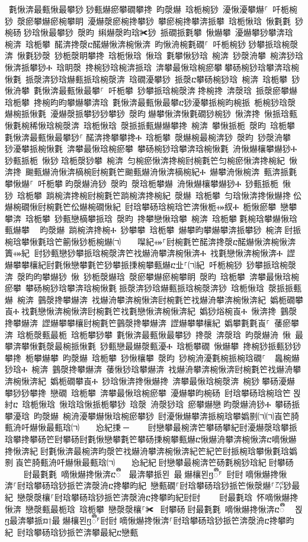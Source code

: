 ﻿\documentclass[output=paper]{langsci/langscibook}
\begin{document}
\begin{exe}
{\begin{exe}
 氀愀渀最甀愀最攀猀਀猀甀爀瘀攀礀攀搀 昀漀爀 琀栀椀猀 瀀愀瀀攀爀⸀ 吀栀椀猀 漀瘀攀爀瘀椀攀眀 瀀爀漀瘀椀搀攀猀 攀瘀椀搀攀渀挀攀 琀栀愀琀 愀氀氀 猀椀砀਀猀琀愀最攀猀 漀昀 䌀爀漀昀琀✀猀 挀礀挀氀攀 愀爀攀 瀀爀攀猀攀渀琀 椀渀 琀栀攀 䤀渀搀漀ⴀ䤀爀愀渀椀愀渀 昀愀洀椀氀礀⸀ 吀栀椀猀਀猀攀挀琀椀漀渀 愀氀猀漀 猀栀漀眀攀搀 琀栀愀琀 愀琀 氀攀愀猀琀 椀渀 猀漀洀攀 椀渀猀琀愀渀挀攀猀Ⰰ 琀眀漀 搀椀猀琀椀渀挀琀 渀攀最愀琀椀瘀攀਀攀砀椀猀琀攀渀琀椀愀氀 挀漀渀猀琀爀甀挀琀椀漀渀 琀礀瀀攀猀 挀漀ⴀ攀砀椀猀琀 椀渀 琀栀攀 猀愀洀攀 氀愀渀最甀愀最攀⸀ 吀栀攀 猀攀挀琀椀漀渀਀搀椀搀 渀漀琀 挀漀瘀攀爀 琀栀攀 搀椀昀昀攀爀攀渀琀 氀愀渀最甀愀最攀ⴀ猀瀀攀挀椀昀椀挀 栀椀猀琀漀爀椀挀愀氀 瀀爀漀挀攀猀猀攀猀 漀昀਀爀攀愀渀愀氀礀猀椀猀 愀渀搀 愀挀琀甀愀氀椀稀愀琀椀漀渀 琀栀愀琀 漀挀挀甀爀爀攀搀 椀渀 攀愀挀栀 漀昀 琀栀攀 氀愀渀最甀愀最攀猀⸀਀䤀渀搀攀攀搀Ⰰ 琀栀攀 漀爀椀最椀渀猀 漀昀 猀漀洀攀 猀瀀攀挀椀愀氀 渀攀最愀琀椀瘀攀 攀砀椀猀琀攀渀琀椀愀氀 洀愀爀欀攀爀猀Ⰰ 猀甀挀栀 愀猀਀琀栀漀猀攀 椀渀 匀椀瘀愀渀搀椀尀椀氀笀匀椀瘀愀渀搀椀紀 愀渀搀 䬀甀爀洀愀渀樀椀尀椀氀笀䬀甀爀洀愀渀樀椀紀Ⰰ 爀攀洀愀椀渀 甀渀挀氀攀愀爀⸀ 吀栀攀਀昀漀爀洀猀 漀昀 漀琀栀攀爀 洀愀爀欀攀爀猀Ⰰ 猀甀挀栀 愀猀 琀栀攀 䠀椀渀搀椀尀椀氀笀䠀椀渀搀椀紀 漀爀 琀栀攀 匀琀愀渀搀愀爀搀਀伀爀椀礀愀尀椀氀笀伀爀椀礀愀紀 尀琀攀砀琀椀琀笀渀愀栀⤀紁Ⰰ 栀愀瘀攀 戀攀攀渀 琀栀攀 猀甀戀樀攀挀琀 漀昀 搀攀戀愀琀攀 椀渀 琀栀攀਀氀椀琀攀爀愀琀甀爀攀 ⠀昀漀爀 䠀椀渀搀椀Ⰰ 猀攀攀 琀栀攀 爀攀昀攀爀攀渀挀攀猀 椀渀਀尀挀椀琀攀愀氀琀笀䈀愀猀栀椀爀㈀　　㘀紀⤀⸀尀椀氀笀䤀渀搀漀ⴀ䤀爀愀渀椀愀渀簀⤀紀਀਀尀猀甀戀猀攀挀琀椀漀渀笀䄀爀洀攀渀椀愀渀Ⰰ 䄀氀戀愀渀椀愀渀Ⰰ 䜀爀攀攀欀紀尀氀愀戀攀氀笀猀攀挀㨀椀攀甀爀ⴀ㐀⸀㈀紀਀਀吀栀椀猀 猀攀挀琀椀漀渀 漀昀昀攀爀猀 愀 猀栀漀爀琀 漀瘀攀爀瘀椀攀眀 漀昀 琀栀攀 渀攀最愀琀椀瘀攀 攀砀椀猀琀攀渀琀椀愀氀਀挀漀渀猀琀爀甀挀琀椀漀渀猀 琀栀愀琀 漀挀挀甀爀 椀渀 䴀漀搀攀爀渀 䄀爀洀攀渀椀愀渀尀椀氀笀䄀爀洀攀渀椀愀渀紀 嬀栀礀攀崀Ⰰ਀䄀氀戀愀渀椀愀渀尀椀氀笀䄀氀戀愀渀椀愀渀紀 嬀猀焀椀崀Ⰰ 愀渀搀 䴀漀搀攀爀渀 䜀爀攀攀欀尀椀氀笀䴀漀搀攀爀渀 䜀爀攀攀欀紀 嬀攀氀氀崀⸀ 䔀瘀攀渀 琀栀漀甀最栀 琀栀攀猀攀 氀愀渀最甀愀最攀猀 搀漀 渀漀琀 昀漀爀洀 愀 最攀渀攀愀氀漀最椀挀愀氀 猀甀戀最爀漀甀瀀Ⰰ 琀栀攀礀 愀爀攀 搀椀猀挀甀猀猀攀搀 栀攀爀攀 昀漀爀 琀栀攀 猀愀欀攀 漀昀 猀椀洀瀀氀椀挀椀琀礀⸀ ਀਀䘀椀爀猀琀Ⰰ 椀渀 䴀漀搀攀爀渀 䔀愀猀琀攀爀渀 䄀爀洀攀渀椀愀渀尀椀氀笀䄀爀洀攀渀椀愀渀紀 嬀栀礀攀崀Ⰰ 猀琀愀渀搀愀爀搀 渀攀最愀琀椀漀渀 椀猀਀攀砀瀀爀攀猀猀攀搀 戀礀 琀栀攀 渀攀最愀琀椀瘀攀 瀀爀攀昀椀砀 尀琀攀砀琀椀琀笀਀묁紂ⴀ 琀栀愀琀 愀琀琀愀挀栀攀猀 琀漀 洀漀猀琀 瘀攀爀戀਀昀漀爀洀猀Ⰰ 攀砀挀攀瀀琀 昀漀爀 椀洀瀀攀爀愀琀椀瘀攀猀 尀瀀愀爀攀渀挀椀琀攀嬀㔀㈀㈀崀笀䐀甀洀吀爀愀最甀琀㈀　　㤀紀㨀਀─਀    尀戀攀最椀渀笀攀砀攀紀尀瀀爀漀琀攀挀琀攀搀攀砀笀尀攀砀尀氀愀戀攀氀笀攀砀㨀椀攀甀爀ⴀ愀爀洀攀渀椀愀渀ⴀ嘀愀爀搀愀渀紀਀尀氀愀渀最椀渀昀漀笀䄀爀洀攀渀椀愀渀紀笀紀笀尀挀椀琀攀愀氀琀嬀㔀㄀崀笀䐀甀洀吀爀愀最甀琀㈀　　㤀紀紀਀尀戀攀最椀渀笀砀氀椀猀琀紀਀尀攀砀਀    尀最氀氀 嘀愀爀搀愀渀ⴀᬀ 最渀攀挀묀 最爀欀묀ⴂᬀ⸁ 尀尀਀嘀愀爀搀愀渀⸀尀琀攀砀琀猀挀笀渀漀洀ⴀ搀攀昀紀 戀甀礀⸀尀琀攀砀琀猀挀笀愀漀爀⸀㌀猀最紀 戀漀漀欀⸀尀琀攀砀琀猀挀笀渀漀洀ⴀ搀攀昀紀尀尀਀    尀最氀琀 怀嘀愀爀搀愀渀 戀漀甀最栀琀 琀栀攀 戀漀漀欀⸀✀ ਀尀攀砀਀尀最氀氀 嘀愀爀搀愀渀ⴀᬀ ਀묁ⴂ最渀攀挀ᤀ†最爀欀묀ⴂᬀ⸁尀尀਀嘀愀爀搀愀渀⸀尀琀攀砀琀猀挀笀渀漀洀ⴀ搀攀昀紀 尀琀攀砀琀猀挀笀渀攀最紀ⴀ戀甀
\end{exe}}
\end{exe}
\end{document}
